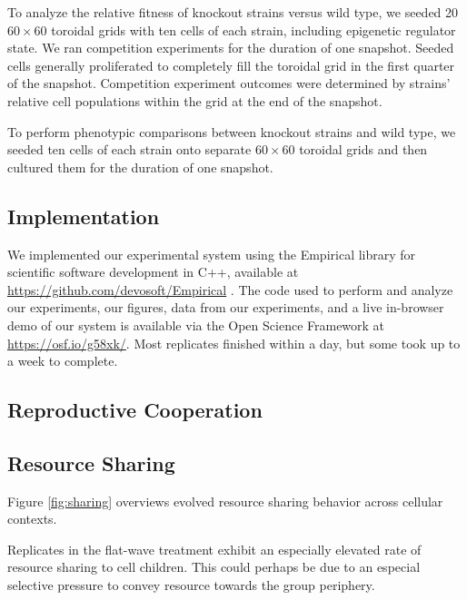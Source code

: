 To analyze the relative fitness of knockout strains versus wild type, we seeded 20 $60 \times 60$ toroidal grids with ten cells of each strain, including epigenetic regulator state.
We ran competition experiments for the duration of one snapshot.
Seeded cells generally proliferated to completely fill the toroidal grid in the first quarter of the snapshot.
Competition experiment outcomes were determined by strains' relative cell populations within the grid at the end of the snapshot.

To perform phenotypic comparisons between knockout strains and wild type, we seeded ten cells of each strain onto separate $60 \times 60$ toroidal grids and then cultured them for the duration of one snapshot.

\subsection{Implementation} \label{sup:implementation}

We implemented our experimental system using the Empirical library for scientific software development in C++, available at \url{https://github.com/devosoft/Empirical} \citep{charles_ofria_2019_2575607}.
The code used to perform and analyze our experiments, our figures, data from our experiments, and a live in-browser demo of our system is available via the Open Science Framework at \url{https://osf.io/g58xk/}.
Most replicates finished within a day, but some took up to a week to complete.

\subsection{Reproductive Cooperation} \label{sup:reproductive-cooperation}



\subsection{Resource Sharing} \label{sec:resource-sharing}




Figure \ref{fig:sharing} overviews evolved resource sharing behavior across cellular contexts.

Replicates in the flat-wave treatment exhibit an especially elevated rate of resource sharing to cell children.
This could perhaps be due to an especial selective pressure to convey resource towards the group periphery.

